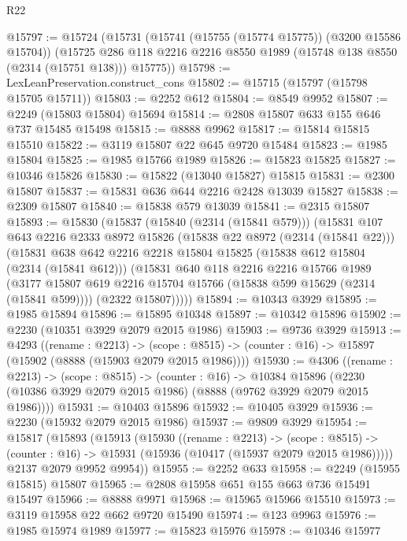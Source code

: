 \begin{lexlean}{R22}
\begin{coremodule}
@15797 := @15724
    (@15731
      (@15741 (@15755 (@15774 @15775)) (@3200 @15586 @15704))
      (@15725 @286 @118 @2216 @2216 @8550 @1989 (@15748 @138 @8550 (@2314 (@15751 @138))) @15775))
@15798 := LexLeanPreservation.construct_cons
@15802 := @15715 (@15797 (@15798 @15705 @15711))
@15803 := @2252 @612
@15804 := @8549 @9952
@15807 := @2249 (@15803 @15804) @15694
@15814 := @2808 @15807 @633 @155 @646 @737 @15485 @15498
@15815 := @8888 @9962
@15817 := @15814 @15815 @15510
@15822 := @3119 @15807 @22 @645 @9720 @15484
@15823 := @1985 @15804
@15825 := @1985 @15766 @1989
@15826 := @15823 @15825
@15827 := @10346 @15826
@15830 := @15822 (@13040 @15827) @15815
@15831 := @2300 @15807
@15837 := @15831 @636 @644 @2216 @2428 @13039 @15827
@15838 := @2309 @15807
@15840 := @15838 @579 @13039
@15841 := @2315 @15807
@15893 := @15830
    (@15837
      (@15840 (@2314 (@15841 @579)))
      (@15831
        @107
        @643
        @2216
        @2333
        @8972
        @15826
        (@15838 @22 @8972 (@2314 (@15841 @22)))
        (@15831
          @638
          @642
          @2216
          @2218
          @15804
          @15825
          (@15838 @612 @15804 (@2314 (@15841 @612)))
          (@15831
            @640
            @118
            @2216
            @2216
            @15766
            @1989
            (@3177 @15807 @619 @2216 @15704 @15766 (@15838 @599 @15629 (@2314 (@15841 @599))))
            (@2322 @15807)))))
@15894 := @10343 @3929
@15895 := @1985 @15894
@15896 := @15895 @10348
@15897 := @10342 @15896
@15902 := @2230 (@10351 @3929 @2079 @2015 @1986)
@15903 := @9736 @3929
@15913 := @4293
    ((rename : @2213) ->
    (scope : @8515) -> (counter : @16) -> @15897 (@15902 (@8888 (@15903 @2079 @2015 @1986))))
@15930 := @4306
    ((rename : @2213) ->
    (scope : @8515) ->
    (counter : @16) ->
    @10384 @15896 (@2230 (@10386 @3929 @2079 @2015 @1986) (@8888 (@9762 @3929 @2079 @2015 @1986))))
@15931 := @10403 @15896
@15932 := @10405 @3929
@15936 := @2230 (@15932 @2079 @2015 @1986)
@15937 := @9809 @3929
@15954 := @15817
    (@15893
      (@15913
        (@15930
          ((rename : @2213) ->
          (scope : @8515) ->
          (counter : @16) -> @15931 (@15936 (@10417 (@15937 @2079 @2015 @1986)))))
        @2137
        @2079
        @9952
        @9954))
@15955 := @2252 @633
@15958 := @2249 (@15955 @15815) @15807
@15965 := @2808 @15958 @651 @155 @663 @736 @15491 @15497
@15966 := @8888 @9971
@15968 := @15965 @15966 @15510
@15973 := @3119 @15958 @22 @662 @9720 @15490
@15974 := @123 @9963
@15976 := @1985 @15974 @1989
@15977 := @15823 @15976
@15978 := @10346 @15977

\end{coremodule}
\end{lexlean}
